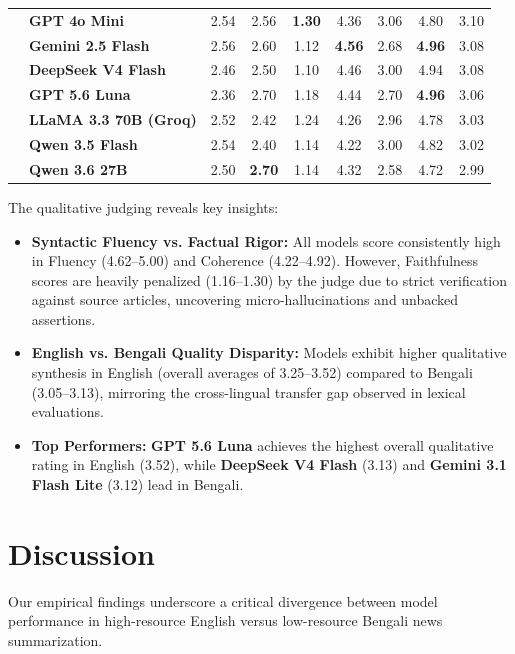 \documentclass[runningheads]{llncs}
\begin{document}
\begin{table}[t]
{\begin{tabular}{llccccccc}
 & \textbf{GPT 4o Mini} & 2.54 & 2.56 & \textbf{1.30} & 4.36 & 3.06 & 4.80 & 3.10 \\
 & \textbf{Gemini 2.5 Flash} & 2.56 & 2.60 & 1.12 & \textbf{4.56} & 2.68 & \textbf{4.96} & 3.08 \\
 & \textbf{DeepSeek V4 Flash} & 2.46 & 2.50 & 1.10 & 4.46 & 3.00 & 4.94 & 3.08 \\
 & \textbf{GPT 5.6 Luna} & 2.36 & 2.70 & 1.18 & 4.44 & 2.70 & \textbf{4.96} & 3.06 \\
 & \textbf{LLaMA 3.3 70B (Groq)} & 2.52 & 2.42 & 1.24 & 4.26 & 2.96 & 4.78 & 3.03 \\
 & \textbf{Qwen 3.5 Flash} & 2.54 & 2.40 & 1.14 & 4.22 & 3.00 & 4.82 & 3.02 \\
 & \textbf{Qwen 3.6 27B} & 2.50 & \textbf{2.70} & 1.14 & 4.32 & 2.58 & 4.72 & 2.99 \\
\bottomrule
\end{tabular}
}
\end{table}

The qualitative judging reveals key insights:
\begin{itemize}
    \item \textbf{Syntactic Fluency vs. Factual Rigor:} All models score consistently high in Fluency (4.62--5.00) and Coherence (4.22--4.92). However, Faithfulness scores are heavily penalized (1.16--1.30) by the judge due to strict verification against source articles, uncovering micro-hallucinations and unbacked assertions.
    \item \textbf{English vs. Bengali Quality Disparity:} Models exhibit higher qualitative synthesis in English (overall averages of 3.25--3.52) compared to Bengali (3.05--3.13), mirroring the cross-lingual transfer gap observed in lexical evaluations.
    \item \textbf{Top Performers:} \textbf{GPT 5.6 Luna} achieves the highest overall qualitative rating in English (3.52), while \textbf{DeepSeek V4 Flash} (3.13) and \textbf{Gemini 3.1 Flash Lite} (3.12) lead in Bengali.
\end{itemize}

%
%
\section{Discussion}\label{sec:discussion}

Our empirical findings underscore a critical divergence between model performance in high-resource English versus low-resource Bengali news summarization. 
\end{document}
